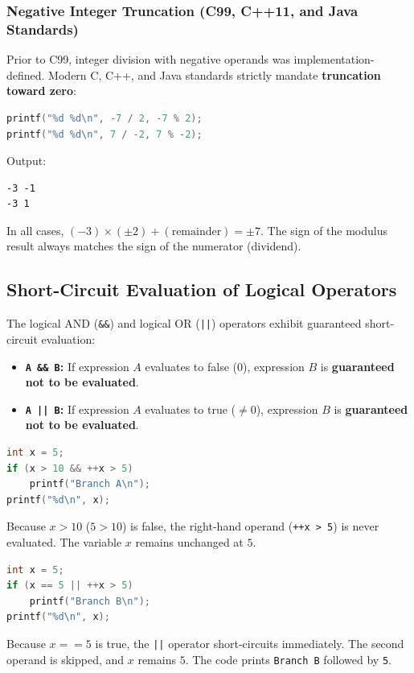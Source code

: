 \subsubsection{Negative Integer Truncation (C99, C++11, and Java Standards)}
Prior to C99, integer division with negative operands was implementation-defined. Modern C, C++, and Java standards strictly mandate \textbf{truncation toward zero}:
\begin{lstlisting}[language=C]
printf("%d %d\n", -7 / 2, -7 % 2);
printf("%d %d\n", 7 / -2, 7 % -2);
\end{lstlisting}
Output:
\begin{lstlisting}
-3 -1
-3 1
\end{lstlisting}
In all cases, $(-3) \times (\pm 2) + (\text{remainder}) = \pm 7$. The sign of the modulus result always matches the sign of the numerator (dividend).

\subsection{Short-Circuit Evaluation of Logical Operators}
The logical AND (\texttt{\&\&}) and logical OR (\texttt{||}) operators exhibit guaranteed short-circuit evaluation:
\begin{itemize}[leftmargin=*]
    \item \textbf{\texttt{A \&\& B}:} If expression $A$ evaluates to false ($0$), expression $B$ is \textbf{guaranteed not to be evaluated}.
    \item \textbf{\texttt{A || B}:} If expression $A$ evaluates to true ($\ne 0$), expression $B$ is \textbf{guaranteed not to be evaluated}.
\end{itemize}

\begin{lstlisting}[language=C]
int x = 5;
if (x > 10 && ++x > 5)
    printf("Branch A\n");
printf("%d\n", x);
\end{lstlisting}
Because $x > 10$ ($5 > 10$) is false, the right-hand operand (\texttt{++x > 5}) is never evaluated. The variable $x$ remains unchanged at $5$.

\begin{lstlisting}[language=C]
int x = 5;
if (x == 5 || ++x > 5)
    printf("Branch B\n");
printf("%d\n", x);
\end{lstlisting}
Because $x == 5$ is true, the \texttt{||} operator short-circuits immediately. The second operand is skipped, and $x$ remains $5$. The code prints \texttt{Branch B} followed by \texttt{5}.

